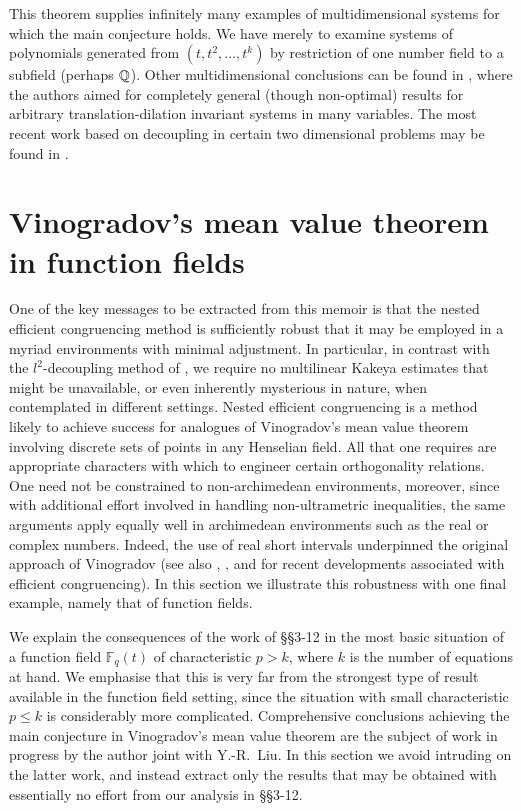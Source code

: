 \documentclass[12pt,reqno]{amsart}
\theoremstyle{definition}
\theoremstyle{remark}
\numberwithin{equation}{section}
\def\dbF{{\mathbb F}}\def\dbK{{\mathbb K}}
\def\le{\leqslant} \def\ge{\geqslant} \def\pleq{\preccurlyeq} \def\ple{\prec}
\begin{document}
This theorem supplies infinitely many examples of multidimensional systems for which the 
main conjecture holds. We have merely to examine systems of polynomials generated from 
$(t,t^2,\ldots ,t^k)$ by restriction of one number field to a subfield (perhaps ${\mathbb Q}$). 
Other multidimensional conclusions can be found in \cite{PPW2013}, where the authors 
aimed for completely general (though non-optimal) results for arbitrary translation-dilation 
invariant systems in many variables. The most recent work based on decoupling in certain 
two dimensional problems may be found in \cite{BDG2017, Guo2017}.

\section{Vinogradov's mean value theorem in function fields} One of the key messages to 
be extracted from this memoir is that the nested efficient congruencing method is 
sufficiently robust that it may be employed in a myriad environments with minimal 
adjustment. In particular, in contrast with the $l^2$-decoupling method of \cite{BDG2016}, 
we require no multilinear Kakeya estimates that might be unavailable, or even inherently 
mysterious in nature, when contemplated in different settings. Nested efficient congruencing 
is a method likely to achieve success for analogues of Vinogradov's mean value theorem 
involving discrete sets of points in any Henselian field. All that one requires are appropriate 
characters with which to engineer certain orthogonality relations. One need not be 
constrained to non-archimedean environments, moreover, since with additional effort 
involved in handling non-ultrametric inequalities, the same arguments apply equally well in 
archimedean environments such as the real or complex numbers. Indeed, the use of real 
short intervals underpinned the original approach of Vinogradov \cite{Vin1935} (see also 
\cite{Hua1949b}, \cite[Chapter VI]{Tit1986}, and \cite{Ste2017} for recent developments 
associated with efficient congruencing). In this section we illustrate this robustness with one 
final example, namely that of function fields.\par

We explain the consequences of the work of \S\S3-12 in the most basic situation of a 
function field $\dbF_q(t)$ of characteristic $p>k$, where $k$ is the number of equations at 
hand. We emphasise that this is very far from the strongest type of result available in the 
function field setting, since the situation with small characteristic $p\le k$ is considerably 
more complicated. Comprehensive conclusions achieving the main conjecture in Vinogradov's 
mean value theorem are the subject of work in progress by the author joint with Y.-R.~Liu. 
In this section we avoid intruding on the latter work, and instead extract only the results 
that may be obtained with essentially no effort from our analysis  in \S\S3-12.\par
\end{document}
